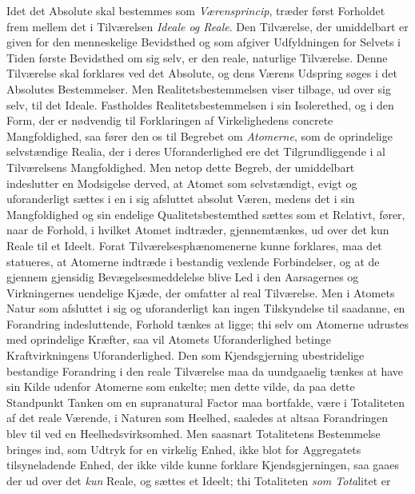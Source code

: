 Idet det Absolute skal bestemmes som \emph{Værensprincip}, træder først
Forholdet frem mellem det i Tilværelsen \emph{Ideale og Reale}. Den
Tilværelse, der umiddelbart er given for den menneskelige Bevidsthed og som
afgiver Udfyldningen for Selvets i Tiden første Bevidsthed om sig selv, er den
reale, naturlige Tilværelse. Denne Tilværelse skal forklares ved det Absolute,
og dens Værens Udspring søges i det Absolutes Bestemmelser. Men
Realitetsbestemmelsen viser tilbage, ud over sig selv, til det Ideale.
Fastholdes Realitetsbestemmelsen i sin Isolerethed, og i den Form, der er
nødvendig til Forklaringen af Virkelighedens concrete Mangfoldighed, saa fører
den os til Begrebet om \emph{Atomerne}, som de oprindelige selvstændige
Realia, der i deres Uforanderlighed ere det Tilgrundliggende i al
Tilværelsens Mangfoldighed. Men netop dette Begreb, der umiddelbart
indeslutter en Modsigelse derved, at Atomet som selvstændigt, evigt og
uforanderligt sættes i en i sig afsluttet absolut Væren, medens det i sin
Mangfoldighed og sin endelige Qualitetsbestemthed sættes som et Relativt,
fører, naar de Forhold, i hvilket Atomet indtræder, gjennemtænkes, ud over det
kun Reale til et Ideelt. Forat Tilværelsesphænomenerne kunne forklares, maa
det statueres, at Atomerne indtræde i bestandig vexlende Forbindelser, og at
de gjennem gjensidig
 Bevægelsesmeddelelse blive Led i den Aarsagernes og Virkningernes uendelige
Kjæde, der omfatter al real Tilværelse. Men i Atomets Natur som afsluttet i
sig og uforanderligt kan ingen Tilskyndelse til saadanne, en Forandring
indesluttende, Forhold tænkes at ligge; thi selv om Atomerne udrustes med
oprindelige Kræfter, saa vil Atomets Uforanderlighed betinge Kraftvirkningens
Uforanderlighed. Den som Kjendsgjerning ubestridelige bestandige Forandring i
den reale Tilværelse maa da uundgaaelig tænkes at have sin Kilde udenfor
Atomerne som enkelte; men dette vilde, da paa dette Standpunkt Tanken om en
supranatural Factor maa bortfalde, være i Totaliteten af det reale Værende, i
Naturen som Heelhed, saaledes at altsaa Forandringen blev til ved en
Heelhedsvirksomhed. Men saasnart Totalitetens Bestemmelse bringes ind, som
Udtryk for en virkelig Enhed, ikke blot for Aggregatets tilsyneladende Enhed,
der ikke vilde kunne forklare Kjendsgjerningen, saa gaaes der ud over det
\emph{kun} Reale, og sættes et Ideelt; thi Totaliteten \emph{som Tota}litet er
